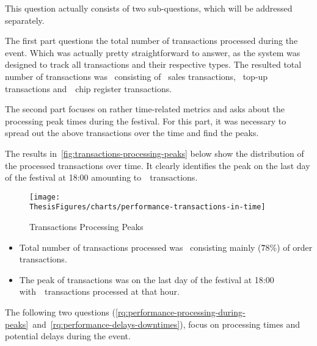 \begin{rqbox}
	\textit{}
\end{rqbox}

This question actually consists of two sub-questions, which will be addressed separately.

The first part questions the total number of transactions processed during the event.
Which was actually pretty straightforward to answer, as the system was designed to track all transactions and their respective types.
The resulted total number of transactions was~ consisting of ~sales transactions, ~top-up transactions and~~chip register transactions.

The second part focuses on rather time-related metrics and asks about the processing peak times during the festival.
For this part, it was necessary to spread out the above transactions over the time and find the peaks.

The results in~\autoref{fig:transactions-processing-peaks} below show the distribution of the processed transactions over time.
It clearly identifies the peak on the last day of the festival at 18:00 amounting to~~transactions.

\begin{figure}[H]
	\centering
	\texttt{[image: \\ThesisFigures/charts/performance-transactions-in-time]}
	\caption{Transactions Processing Peaks}
	\label{fig:transactions-processing-peaks}
	\source
\end{figure}

\begin{keytakeaways}
	\begin{itemize}
		\item Total number of transactions processed was~ consisting mainly (7̃8\%) of order transactions.
		\item The peak of transactions was on the last day of the festival at 18:00 with~~transactions processed at that hour.
	\end{itemize}
\end{keytakeaways}

The following two questions (\autoref{rq:performance-processing-during-peaks}~and~\autoref{rq:performance-delays-downtimes}), focus on processing times and potential delays during the event.

\begin{rqbox}
	\textit{}
\end{rqbox}


